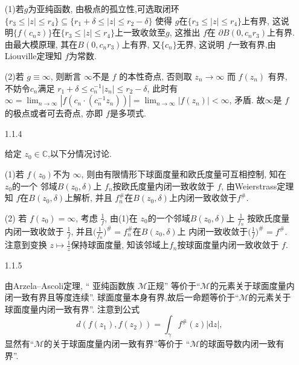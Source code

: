 \begin{itemize}
(1)若$g$为亚纯函数, 由极点的孤立性,可选取闭环$\{r_3\le |z|\le r_4\}
\subseteq \{r_1+\delta\le |z|\le r_2-\delta\}$ 
使得 $g$在$\{r_3\le |z|\le r_4\}$上有界, 
这说明$\{f(c_{n}z)\}$在$\{r_3\le |z|\le r_4\}$上一致收敛至$g$, 
这推出 $f$在 $\partial B(0,c_{n}r_3)$上有界.
由最大模原理, 其在$B(0,c_{n}r_3)$上有界, 又$\{c_n\}$无界, 
这说明 $f$一致有界,由Liouville定理知 $f$为常数.

(2)若 $g\equiv \infty$, 则断言 $\infty$不是 $f$ 的本性奇点, 
否则取 $z_n \to \infty$ 而 $f(z_n)$ 有界, 
不妨令$c_n$满足 $r_1+\delta\le c_n^{-1}|z_n|\le r_2-\delta$, 
此时有 $\infty =\lim_{n \to \infty}|f(c_{n}\cdot (c_{n}^{-1}z_{n}))| 
=\lim_{n \to \infty}|f(z_n)|  <\infty$, 矛盾. 
故$\infty$是 $f$的极点或者可去奇点, 亦即 $f$是多项式.


    \item[1.1.4]

给定 $z_0 \in \mathbb{C}$,以下分情况讨论.

(1)若 $f(z_0)$不为 $\infty$, 则由有限情形下球面度量和欧氏度量可互相控制, 
知在 $z_0$的一个 邻域$B(z_0,\delta)$上 $f_n$按欧氏度量内闭一致收敛于 $f$, 
由Weierstrass定理知 $f$在$B(z_0,\delta)$上解析, 
并且 $f^{\#}_n$在$B(z_0,\delta)$上内闭一致收敛于$f^{\#}$.

(2) 若 $f(z_0)=\infty$, 考虑 $\frac{1}{f}$, 
由(1)在 $z_0$的一个邻域$B(z_0,\delta)$上 $\frac{1}{f_n}$
按欧氏度量内闭一致收敛于 $\frac{1}{f}$, 
并且$\big(\frac{1}{f_n}\big)^{\#} = f^{\#}_n$在$B(z_0,\delta)$上
内闭一致收敛于$\big(\frac{1}{f}\big)^{\#} =f^{\#}$.
注意到变换 $z\mapsto \frac{1}{z}$保持球面度量, 
知该邻域上$f_n$按球面度量内闭一致收敛于 $f$.


    \item[1.1.5]

由Arzela--Ascoli定理, “ 亚纯函数族 $\mathcal{M}$正规”
等价于“$\mathcal{M}$的元素关于球面度量内闭一致有界且等度连续”.
球面度量本身有界,故后一命题等价于“$\mathcal{M}$的元素关于球面度量内闭一致有界”. 注意到公式
$$d(f(z_1),f(z_2)) = \int_{\gamma}f^{\#}(z)|\mathrm{d}z|,$$
显然有“$\mathcal{M}$的关于球面度量内闭一致有界”等价于
“$\mathcal{M}$的球面导数内闭一致有界”.
\end{itemize}

